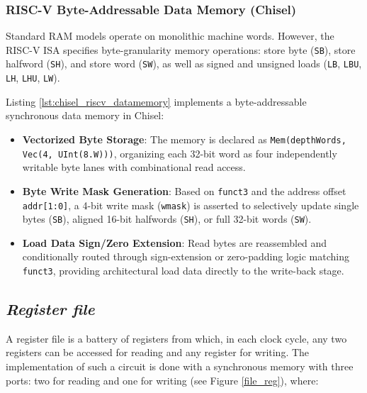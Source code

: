 {\subsubsection{RISC-V Byte-Addressable Data Memory (Chisel)}
Standard RAM models operate on monolithic machine words. However, the RISC-V ISA specifies byte-granularity memory operations: store byte (\texttt{SB}), store halfword (\texttt{SH}), and store word (\texttt{SW}), as well as signed and unsigned loads (\texttt{LB}, \texttt{LBU}, \texttt{LH}, \texttt{LHU}, \texttt{LW}).

Listing \ref{lst:chisel_riscv_datamemory} implements a byte-addressable synchronous data memory in Chisel:
\begin{itemize}
    \item \textbf{Vectorized Byte Storage}: The memory is declared as \texttt{Mem(depthWords, Vec(4, UInt(8.W)))}, organizing each 32-bit word as four independently writable byte lanes with combinational read access.
    \item \textbf{Byte Write Mask Generation}: Based on \texttt{funct3} and the address offset \texttt{addr[1:0]}, a 4-bit write mask (\texttt{wmask}) is asserted to selectively update single bytes (\texttt{SB}), aligned 16-bit halfwords (\texttt{SH}), or full 32-bit words (\texttt{SW}).
    \item \textbf{Load Data Sign/Zero Extension}: Read bytes are reassembled and conditionally routed through sign-extension or zero-padding logic matching \texttt{funct3}, providing architectural load data directly to the write-back stage.
\end{itemize}


} %



\subsection{{\bf {\em Register file}}}\label{registerFile} 

A register file is a battery of registers from which, in each clock cycle, any two registers can be accessed for reading and any register for writing. The implementation of such a circuit is done with a synchronous memory with three ports: two for reading and one for writing (see Figure \ref{file_reg}), where:

